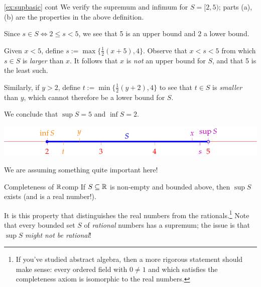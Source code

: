 \begin{example*}{\ref{ex:supbasic} cont}{}
	We verify the supremum and infimum for $S=[2,5)$; parts (a), (b) are the properties in the above definition.	
	\begin{enumeratea}
		\item Since $s\in S\iff 2\le s<5$, we see that 5 is an upper bound and 2 a lower bound.
		\item Given $x<5$, define\footnotemark{} $s:=\max\{\frac 12(x+5),4\}$. Observe that $x<s<5$ from which $s\in S$ is \emph{larger} than $x$. It follows that $x$ is \emph{not} an upper bound for $S$, and that 5 is the least such.\par
		Similarly, if $y>2$, define $t:=\min\{\frac 12(y+2),4\}$ to see that $t\in S$ is \emph{smaller} than $y$, which cannot therefore be a lower bound for $S$.
	\end{enumeratea}
	
	We conclude that $\sup S=5$ and $\inf S=2$.
	
	\begin{center}
		\vspace{-5pt}
		\includegraphics{supinf3}
	\end{center}
\end{example*}


We are assuming something quite important here!

\begin{axiom}{Completeness of $\mathbb{R}$}{comp}
	If $S\subseteq\mathbb{R}$ is non-empty and bounded above, then $\sup S$ exists (and is a real number!).
\end{axiom}

It is this property that distinguishes the real numbers from the rationals.\footnote{\label{fn:syntheticR}If you've studied abstract algebra, then a more rigorous statement should make sense: every ordered field with $0\neq 1$ and which satisfies the completeness axiom is isomorphic to the real numbers.} Note that every bounded set $S$ of \emph{rational} numbers has a supremum; the issue is that $\sup S$ \emph{might not be rational}!

